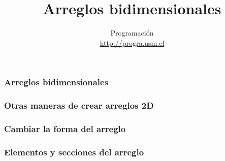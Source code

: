 \documentclass[12pt]{beamer}
\title{Arreglos bidimensionales}
\author{
  Programación \\ \url{http://progra.usm.cl}
}
\date{}
\begin{document}
  \begin{frame}
    \maketitle
  \end{frame}

  \begin{frame}
    \label{crear-arreglo-bidmensional}
    \frametitle{Arreglos bidimensionales}
    
  \end{frame}

  \begin{frame}
    \label{crear-arreglo-bidmensional-funciones}
    \frametitle{Otras maneras de crear arreglos 2D}
    
  \end{frame}

  \begin{frame}
    \label{cambiar-forma}
    \frametitle{Cambiar la forma del arreglo}
    
  \end{frame}

  \begin{frame}
    \label{indices}
    \frametitle{Elementos y secciones del arreglo}
    
  \end{frame}
\end{document}
